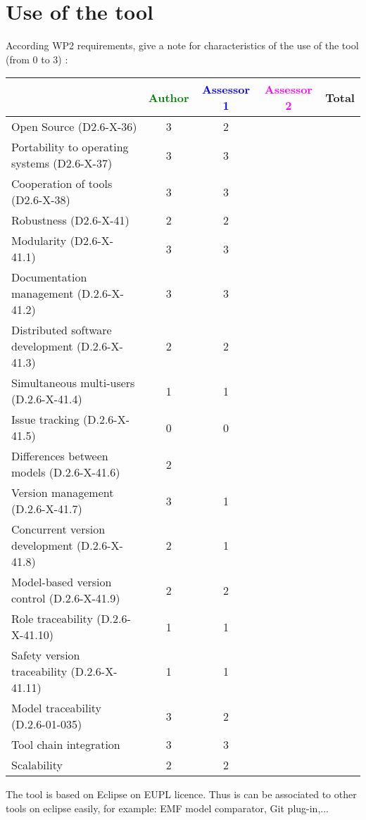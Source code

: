 \section{Use of the tool}


According WP2 requirements, give a note for characteristics of the use of the tool (from 0 to 3) :

\begin{tabular}{|l | c | c | c | c|}
\hline
& \textcolor{green}{Author} & \textcolor{blue}{Assessor 1} & \textcolor{magenta}{Assessor 2} & Total \\
\hline 
Open Source (D2.6-X-36) & 3 & 2 & &  \\
\hline 
Portability to operating systems (D2.6-X-37) & 3 & 3 & &  \\
\hline
Cooperation of tools (D2.6-X-38) & 3 & 3 & &  \\
\hline
Robustness (D2.6-X-41) & 2 & 2 & & \\
\hline
Modularity (D2.6-X-41.1) & 3 & 3 & & \\
\hline
Documentation management (D.2.6-X-41.2) & 3 & 3 & & \\
\hline
Distributed software development (D.2.6-X-41.3)  & 2 & 2 & & \\
\hline
Simultaneous multi-users (D.2.6-X-41.4)   & 1 & 1 & & \\
\hline
Issue tracking (D.2.6-X-41.5) & 0 & 0 & & \\
\hline
Differences between models (D.2.6-X-41.6) & 2 & & & \\
\hline
Version management (D.2.6-X-41.7) & 3 & 1 & & \\
\hline
Concurrent version development (D.2.6-X-41.8) & 2 & 1 & & \\
\hline
Model-based version control (D.2.6-X-41.9) & 2 & 2 & & \\
\hline
Role traceability (D.2.6-X-41.10) & 1 & 1 & & \\
\hline
Safety version traceability (D.2.6-X-41.11) & 1 & 1 & & \\
\hline
Model traceability (D.2.6-01-035) & 3 & 2 & & \\
\hline
Tool chain integration & 3 & 3 & & \\
\hline
Scalability & 2 & 2 & & \\
\hline
\end{tabular}

\begin{author_comment}
The tool is based on Eclipse on EUPL licence. Thus is can be associated to  other tools on eclipse easily, for example: EMF model comparator, Git plug-in,...
\end{author_comment}


